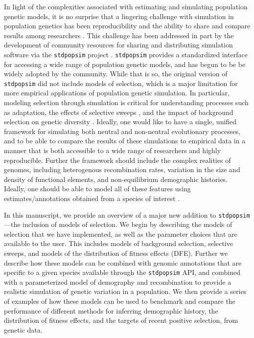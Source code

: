 \documentclass[hidelinks]{article}
\newcommand{\stdpopsim}{\texttt{stdpopsim}\xspace}
\begin{document}
    In light of the complexities associated with estimating and simulating
    population genetic models, it is no surprise that
    a lingering challenge with simulation in population genetics has been
    reproducibility and the ability to share and compare results among 
    researchers \citep[e.g.,][]{ragsdale2020lessons}.
    This challenge has been addressed in part by the development
    of community resources for sharing and distributing simulation software
    via the \stdpopsim project \citep{adrion2020community}. \stdpopsim
    provides a standardized interface for accessing a wide range of
    population genetic models, and has begun to be be widely adopted by the community. %
    While that is so, the original version of \stdpopsim did not include
    models of selection, which is a major limitation for more empirical
    applications of population genetic simulation. In particular, modeling selection
    through simulation is critical for understanding processes such
    as adaptation, the effects of selective sweeps \citep[e.g.][]{braverman1995hitchhiking,fay2000hitchhiking,przeworski2002signature,przeworski2005signature,schrider2015soft}, and the impact of
    background selection on genetic diversity
    \citep[e.g.][]{charlesworth1993effect,charlesworth1995pattern,williamson2002genealogy,ewing2016consequences,torres2020temporal}.
    Ideally, one would like
    to have a single, unified framework for simulating both neutral and
    non-neutral evolutionary processes, and to be able to compare the
    results of these simulations to empirical data in a manner that is
    both accessible to a wide range of researchers and highly reproducible. 
    Further the framework should include the complex realities of 
    genomes, including heterogenous recombination rates, 
    variation in the size and density of functional elements, and
    non-equilibrium demographic histories. Ideally, one should be able
    to model all of these features using estimates/annotations obtained
    from a species of interest \citep[e.g.][]{schrider2020background,rodrigues2024shared}.

    In this manuscript, we provide an overview of a major new addition
    to \stdpopsim---the inclusion of models of selection.
    We begin by describing the models of selection that we have implemented,
    as well as the parameter choices that are available to the user.
    This includes models of background selection, selective sweeps, and
    models of the distribution of fitness effects (DFE).
    Further we describe how these models can be combined with genomic
    annotations that are specific to a given species available
    through the \stdpopsim API, and combined with a parameterized model of
    demography and recombination to provide a realistic simulation of
    genetic variation in a population.
    We then provide a series of examples of how these models can be used
    to benchmark and compare the performance of different methods for
    inferring demographic history, the distribution of fitness effects,
    and the targets of recent positive selection, from genetic data. 
\end{document}
